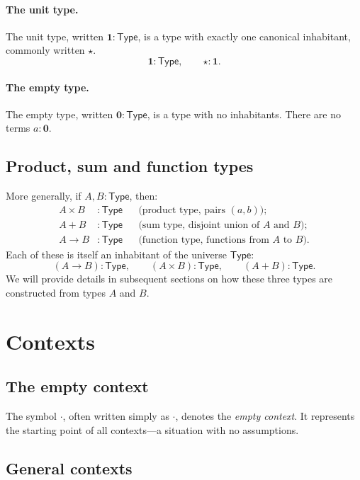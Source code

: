 \documentclass{article}
\newcommand{\Type}{\mathsf{Type}}
\newcommand{\emptyctx}{\cdot}              %
\newcommand{\ctx}{\mathsf{ctx}}            %
\begin{document}
\paragraph{The unit type.}
The unit type, written \(\mathbf{1} : \Type\), is a type with exactly one canonical inhabitant, commonly written \(\star\).
\[
\mathbf{1} : \Type, \qquad \star : \mathbf{1}.
\]

\paragraph{The empty type.}
The empty type, written \(\mathbf{0} : \Type\), is a type with no inhabitants.  
There are no terms \(a : \mathbf{0}\).  


\subsection*{Product, sum and function types}

More generally, if \(A,B : \Type\), then:
\[
\begin{aligned}
A \times B &:\Type &&\text{(product type, pairs \((a,b)\));}\\
A + B &:\Type &&\text{(sum type, disjoint union of \(A\) and \(B\));}\\
A \to B &:\Type &&\text{(function type, functions from \(A\) to \(B\)).}
\end{aligned}
\]
Each of these is itself an inhabitant of the universe \(\Type\):
\[
(A \to B) : \Type, \qquad (A \times B) : \Type, \qquad (A + B) : \Type.
\]
We will provide details in subsequent sections on how these three types are constructed from types $A$ and $B$.

\section{Contexts}

\subsection*{The empty context}
The symbol \(\emptyctx\), often written simply as \(\cdot\), denotes the \emph{empty context}.
It represents the starting point of all contexts---a situation with no assumptions.

\subsection*{General contexts}
\end{document}
